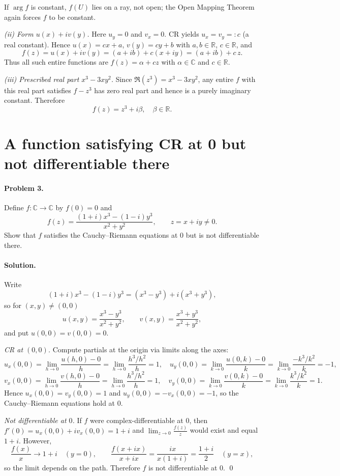 \documentclass[11pt,a4paper]{article}
\theoremstyle{definition}
\theoremstyle{definition}
\theoremstyle{plain}
\theoremstyle{remark}
\begin{document}
If $\arg f$ is constant, $f(U)$ lies on a ray, not open; the Open Mapping Theorem again forces $f$ to be constant.

\medskip
\emph{(ii) Form $u(x)+i v(y)$.}
Here $u_y=0$ and $v_x=0$. CR yields $u_x=v_y=:c$ (a real constant). Hence
$u(x)=cx+a$, $v(y)=cy+b$ with $a,b\in\mathbb R$, $c\in\mathbb R$, and
\[
f(z)=u(x)+i v(y)=(a+ib)+c(x+iy)=(a+ib)+c\,z.
\]
Thus all such entire functions are $f(z)=\alpha + c z$ with $\alpha\in\mathbb C$ and $c\in\mathbb R$.

\medskip
\emph{(iii) Prescribed real part $x^3-3xy^2$.}
Since $\Re(z^3)=x^3-3xy^2$, any entire $f$ with this real part satisfies $f-z^3$ has zero real part and hence is a purely imaginary constant. Therefore
\[
\boxed{\,f(z)=z^3+i\beta,\quad \beta\in\mathbb R.\,}
\]

\section*{A function satisfying CR at 0 but not differentiable there}

\paragraph{Problem 3.}
Define $f:\mathbb C\to\mathbb C$ by $f(0)=0$ and
\[
f(z)=\frac{(1+i)x^{3}-(1-i)y^{3}}{x^{2}+y^{2}},\qquad z=x+iy\ne0.
\]
Show that $f$ satisfies the Cauchy--Riemann equations at $0$ but is not differentiable there.

\paragraph{Solution.}
Write
\[
(1+i)x^3-(1-i)y^3=(x^3-y^3)+i(x^3+y^3),
\]
so for $(x,y)\neq(0,0)$
\[
u(x,y)=\frac{x^3-y^3}{x^2+y^2},\qquad
v(x,y)=\frac{x^3+y^3}{x^2+y^2},
\]
and put $u(0,0)=v(0,0)=0$.

\emph{CR at $(0,0)$.}
Compute partials at the origin via limits along the axes:
\[
u_x(0,0)=\lim_{h\to0}\frac{u(h,0)-0}{h}
=\lim_{h\to0}\frac{h^3/h^2}{h}=1,\quad
u_y(0,0)=\lim_{k\to0}\frac{u(0,k)-0}{k}
=\lim_{k\to0}\frac{-k^3/k^2}{k}=-1,
\]
\[
v_x(0,0)=\lim_{h\to0}\frac{v(h,0)-0}{h}
=\lim_{h\to0}\frac{h^3/h^2}{h}=1,\quad
v_y(0,0)=\lim_{k\to0}\frac{v(0,k)-0}{k}
=\lim_{k\to0}\frac{k^3/k^2}{k}=1.
\]
Hence $u_x(0,0)=v_y(0,0)=1$ and $u_y(0,0)=-v_x(0,0)=-1$, so the Cauchy--Riemann equations hold at $0$.

\emph{Not differentiable at $0$.}
If $f$ were complex-differentiable at 0, then $f'(0)=u_x(0,0)+i v_x(0,0)=1+i$ and
$\displaystyle \lim_{z\to0}\frac{f(z)}{z}$ would exist and equal $1+i$.
However,
\[
\frac{f(x)}{x}\to 1+i\quad(y=0),\qquad
\frac{f(x+ix)}{x+ix}=\frac{i x}{x(1+i)}=\frac{1+i}{2}\quad(y=x),
\]
so the limit depends on the path. Therefore $f$ is not differentiable at $0$.
\qed
\end{document}
